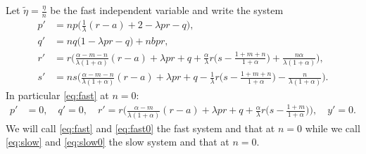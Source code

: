 \documentclass[a4paper,11pt]{article}
\begin{document}
{Let $\tilde\eta=\frac{\eta}{n}$ be the fast independent variable and write the system
\begin{equation} \label{eq:fast}
 \begin{aligned}
 {p}' &=np\Big(\frac{1}{\lambda}(r-a) + 2- \lambda p r -q\Big),\\
 {q}' &=nq\Big(1 -\lambda p r -q\Big) + nb p r,\\
 {r}' &=r\Big(\frac{\alpha-m-n}{\lambda(1+\alpha)}(r-a) + \lambda pr + q +\frac{\alpha}{\lambda}r\big(s- \frac{1+m+n}{1+\alpha}\big) + \frac{n\alpha}{\lambda(1+\alpha)}\Big),\\
 {s}' &=ns\Big(\frac{\alpha-m-n}{\lambda(1+\alpha)}(r-a) + \lambda pr + q - \frac{1}{\lambda}r\big(s- \frac{1+m+n}{1+\alpha}\big) - \frac{n}{\lambda(1+\alpha)}\Big).
 \end{aligned}
\end{equation}
In particular \eqref{eq:fast} at $n=0$:
\begin{equation} \label{eq:fast0}
 \begin{aligned}
 {p}' &=0, \quad {q}' =0, \quad {r}' =r\Big(\frac{\alpha-m}{\lambda(1+\alpha)}(r-a) + \lambda pr + q +\frac{\alpha}{\lambda}r\big(s- \frac{1+m}{1+\alpha}\big)\Big), \quad{y}' =0.
 \end{aligned}
\end{equation}
We will call \eqref{eq:fast} and \eqref{eq:fast0} the fast system and that at $n=0$ while we call \eqref{eq:slow} and \eqref{eq:slow0} the slow system and that at $n=0$.

}
\end{document}
